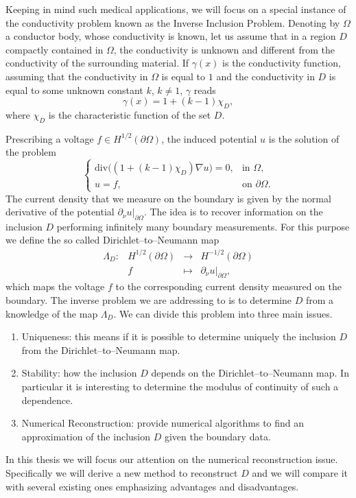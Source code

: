 \documentclass[10pt, a4paper, twoside, openright]{book}
\theoremstyle{definition}
\theoremstyle{plain}
\theoremstyle{plain}
\theoremstyle{plain}
\theoremstyle{plain}
\theoremstyle{plain}
\theoremstyle{plain}
\theoremstyle{plain}
\theoremstyle{plain}
\begin{document}
Keeping in mind such medical applications, we will focus on a special instance of the conductivity problem known as the Inverse Inclusion Problem.
Denoting by $\Omega$ a conductor body, whose conductivity is known, let us assume that in a region $D$ compactly contained in $\Omega$,
the conductivity is unknown and different from the conductivity of the surrounding material. If $\gamma(x)$ is the conductivity function,
assuming that the conductivity in $\Omega$ is equal to $1$ and the conductivity in $D$ is equal to some unknown constant $k$, $k\neq1$,
$\gamma$ reads
$$\gamma(x)=1+(k-1)\chi_D,$$
where $\chi_D$ is the characteristic function of the set $D$.

Prescribing a voltage $f\in H^{1/2}(\partial\Omega)$, the induced potential $u$ is the solution of the problem
$$\left\{\begin{array}{ll}
\mathrm{div}\big((1+(k-1)\chi_D)\nabla u\big)=0, & \textrm{in }\Omega,\\
u=f, & \textrm{on }\partial\Omega.
\end{array}\right.$$
The current density that we measure on the boundary is given by the normal derivative of the potential
$\partial_\nu u|_{\partial\Omega}$. The idea is to recover information on the inclusion $D$ performing infinitely many
boundary measurements. For this purpose we define the so called Dirichlet--to--Neumann map
$$\begin{array}{crcl}
\Lambda_D : & H^{1/2}(\partial\Omega) & \longrightarrow & H^{-1/2}(\partial\Omega)\\
            &   f                     & \longmapsto & \partial_\nu u|_{\partial\Omega},
\end{array}$$
which maps the voltage $f$ to the corresponding current density measured on the boundary.
The inverse problem we are addressing to is to determine $D$ from a knowledge of the map $\Lambda_D$.
We can divide this problem into three main issues.
\begin{enumerate}
\item Uniqueness: this means if it is possible to determine uniquely the inclusion $D$ from the Dirichlet--to--Neumann map.
\item Stability: how the inclusion $D$ depends on the Dirichlet--to--Neumann map. In particular it is interesting
to determine the modulus of continuity of such a dependence.
\item Numerical Reconstruction: provide numerical algorithms to find an approximation of the inclusion $D$ given the boundary data.
\end{enumerate}
In this thesis we will focus our attention on the numerical reconstruction issue.
Specifically we will derive a new method to reconstruct $D$ and we will compare it with several existing ones
emphasizing advantages and disadvantages.
\end{document}
